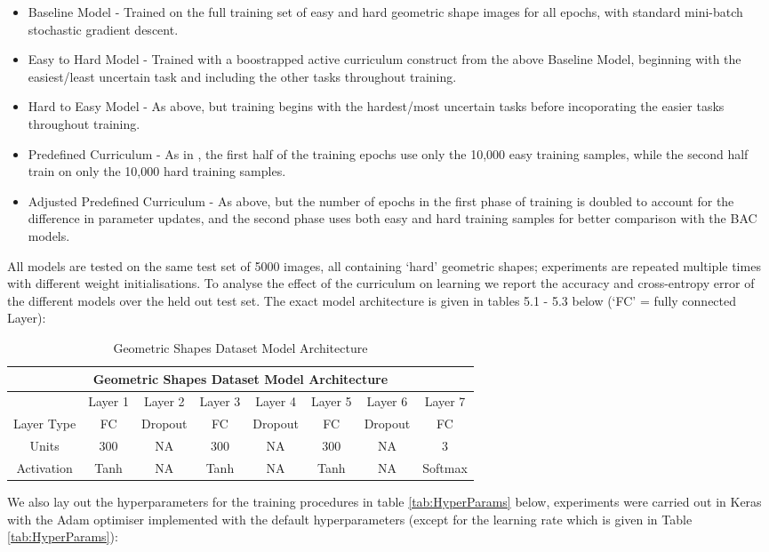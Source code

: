  \begin{itemize}
 \item Baseline Model - Trained on the full training set of easy and hard geometric shape images for all epochs, with standard mini-batch stochastic gradient descent.
 \item Easy to Hard Model - Trained with a boostrapped active curriculum construct from the above Baseline Model, beginning with the easiest/least uncertain task and including the other tasks throughout training.
 \item Hard to Easy Model - As above, but training begins with the hardest/most uncertain tasks before incoporating the easier tasks throughout training.
 \item Predefined Curriculum - As in \cite{Bengio2009}, the first half of the training epochs use only the 10,000 easy training samples, while the second half train on only the 10,000 hard training samples.
 \item Adjusted Predefined Curriculum - As above, but the number of epochs in the first phase of training is doubled to account for the difference in parameter updates, and the second phase uses both easy and hard training samples for better comparison with the BAC models.
 \end{itemize}
 
All models are tested on the same test set of 5000 images, all containing `hard' geometric shapes; experiments are repeated multiple times with different weight initialisations. To analyse the effect of the curriculum on learning we report the accuracy and cross-entropy error of the different models over the held out test set. The exact model architecture is given in tables 5.1 - 5.3 below (`FC' = fully connected Layer):
 
\begin{table}[h]
\caption{Geometric Shapes Dataset Model Architecture} \label{tab:GeoArchitecture}
\begin{tabular}{|c||c|c|c|c|c|c|c|}
\hline
\multicolumn{8}{|c|}{Geometric Shapes Dataset Model Architecture} \\
\hline
 & Layer 1 & Layer 2 & Layer 3& Layer 4 &Layer 5 & Layer 6 & Layer 7 \\
\hline
Layer Type & FC & Dropout & FC & Dropout & FC & Dropout  & FC \\
\hline
Units & 300 & NA & 300 & NA & 300 & NA & 3 \\
\hline
Activation & Tanh \footnotemark & NA & Tanh & NA & Tanh & NA & Softmax \\
\hline
\end{tabular}
\end{table}
We also lay out the hyperparameters for the training procedures in table \ref{tab:HyperParams} below, experiments were carried out in Keras \cite{chollet2015keras} with the Adam optimiser implemented with the default hyperparameters (except for the learning rate which is given in Table \ref{tab:HyperParams}):

